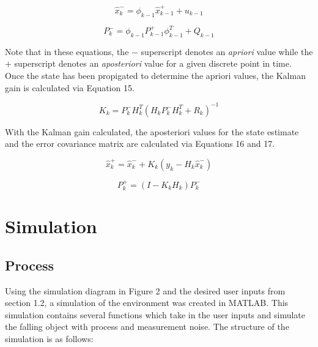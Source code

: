 \documentclass{article}
\begin{document}
\begin{equation}
    \hat{x}_k^-=\phi_{k-1}\hat{x}_{k-1}^++u_{k-1}
\end{equation}

\begin{equation}
    P_k^-=\phi_{k-1}P_{k-1}^+\phi_{k-1}^T+Q_{k-1}
\end{equation}

Note that in these equations, the $-$ superscript denotes an \textit{apriori} value while the $+$ superscript denotes an \textit{aposteriori} value for a given discrete point in time. Once the state has been propigated to determine the apriori values, the Kalman gain is calculated via Equation 15.

\begin{equation}
    K_k = P_k^-H_k^T(H_kP_k^-H_k^T+R_k)^{-1}
\end{equation}

With the Kalman gain calculated, the aposteriori values for the state estimate and the error covariance matrix are calculated via Equations 16 and 17.

\begin{equation}
    \hat{x}_k^+=\hat{x}_k^-+K_k(y_k-H_k\hat{x}_k^-)
\end{equation}

\begin{equation}
    P_k^+=(I-K_kH_k)P_k^-
\end{equation}


\section{Simulation}
\subsection{Process}
Using the simulation diagram in Figure 2 and the desired user inputs from section 1.2, a simulation of the environment was created in MATLAB. This simulation contains several functions which take in the user inputs and simulate the falling object with process and measurement noise. The structure of the simulation is as follows:
\end{document}

